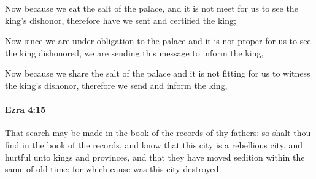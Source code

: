 			\begin{versebox}
					\item[BHS] 
					\item[LXX] 
					\item[ASV] Now because we eat the salt of the palace, and it is not meet for us to see the king's dishonor, therefore have we sent and certified the king;
					\item[NIV] Now since we are under obligation to the palace and it is not proper for us to see the king dishonored, we are sending this message to inform the king,
					\item[NRSV] Now because we share the salt of the palace and it is not fitting for us to witness the king’s dishonor, therefore we send and inform the king,
			\end{versebox}

		\paragraph{Ezra 4:15} %
			\label{EZRA-4-15}

			That search may be made in the book of the records of thy fathers: so shalt thou find in the book of the records, and know that this city is a rebellious city, and hurtful unto kings and provinces, and that they have moved sedition within the same of old time: for which cause was this city destroyed.

